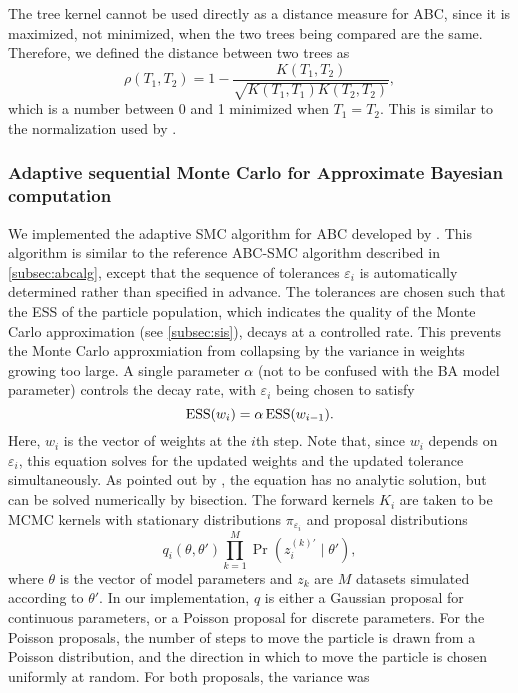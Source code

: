 The tree kernel cannot be used directly as a distance measure for \gls{ABC},
since it is maximized, not minimized, when the two trees being compared are the
same. Therefore, we defined the distance between two trees as
\[
  \rho(T_1, T_2) = 1 - \frac{K(T_1, T_2)}{\sqrt{K(T_1, T_1) K(T_2, T_2)}},
\]
which is a number between 0 and 1 minimized when $T_1 = T_2$. This is similar
to the normalization used by \textcite{collins2002new, poon2013mapping}.

\subsubsection*{Adaptive sequential Monte Carlo for Approximate Bayesian computation}
\label{subsubsec:adaptsmc}

We implemented the adaptive \gls{SMC} algorithm for \gls{ABC} developed by
\textcite{del2012adaptive}. This algorithm is similar to the reference
\gls{ABC}-\gls{SMC} algorithm described in \cref{subsec:abcalg}, except that
the sequence of tolerances $\varepsilon_i$ is automatically determined rather
than specified in advance. The tolerances are chosen such that the \gls{ESS} of
the particle population, which indicates the quality of the Monte Carlo
approximation (see \cref{subsec:sis}), decays at a controlled rate. This
prevents the Monte Carlo approxmiation from collapsing by the variance in
weights growing too large. A single parameter $\alpha$ (not to be confused with
the \gls{BA} model parameter) controls the decay rate, with $\varepsilon_i$
being chosen to satisfy
\[
  \operatorname{ESS}(w_i) = \alpha \operatorname{ESS}(w_{i-1}).
\]
Here, $w_i$ is the vector of weights at the $i$th step. Note that, since $w_i$
depends on $\varepsilon_i$, this equation solves for the updated weights and
the updated tolerance simultaneously. As pointed out by
\textcite{del2012adaptive}, the equation has no analytic solution, but can be
solved numerically by bisection. The forward kernels $K_i$ are taken to be
\gls{MCMC} kernels with stationary distributions $\pi_{\varepsilon_i}$ and
proposal distributions
\[
  q_i(\theta, \theta') \prod_{k=1}^M \Pr(z_i^{(k)'} \mid \theta'),
\]
where $\theta$ is the vector of model parameters and $z_k$ are $M$ datasets
simulated according to $\theta'$. In our implementation, $q$ is either a
Gaussian proposal for continuous parameters, or a Poisson proposal for discrete
parameters. For the Poisson proposals, the number of steps to move the particle
is drawn from a Poisson distribution, and the direction in which to move the
particle is chosen uniformly at random. For both proposals, the variance was
